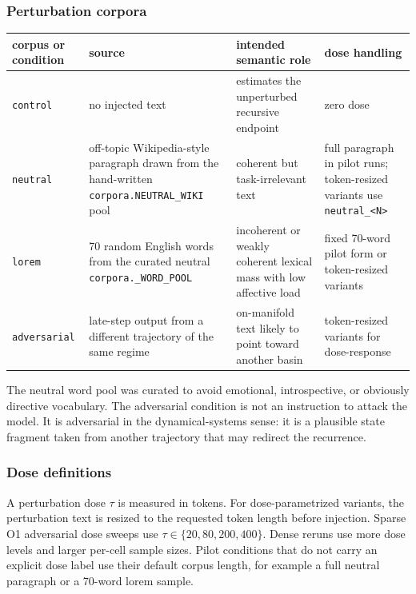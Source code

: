 \documentclass{article}
\theoremstyle{plain}
\theoremstyle{definition}
\begin{document}
\subsubsection*{Perturbation corpora}

\begin{table}[h!]
\centering
\small
\begin{tabularx}{\textwidth}{lYYY}
\toprule
corpus or condition & source & intended semantic role & dose handling \\
\midrule
\texttt{control} & no injected text & estimates the unperturbed recursive endpoint & zero dose \\
\texttt{neutral} & off-topic Wikipedia-style paragraph drawn from the hand-written \texttt{corpora.NEUTRAL\_WIKI} pool & coherent but task-irrelevant text & full paragraph in pilot runs; token-resized variants use \texttt{neutral\_<N>} \\
\texttt{lorem} & 70 random English words from the curated neutral \texttt{corpora.\_WORD\_POOL} & incoherent or weakly coherent lexical mass with low affective load & fixed 70-word pilot form or token-resized variants \\
\texttt{adversarial} & late-step output from a different trajectory of the same regime & on-manifold text likely to point toward another basin & token-resized variants for dose-response \\
\bottomrule
\end{tabularx}
\end{table}

The neutral word pool was curated to avoid emotional, introspective, or obviously directive vocabulary. The adversarial condition is not an instruction to attack the model. It is adversarial in the dynamical-systems sense: it is a plausible state fragment taken from another trajectory that may redirect the recurrence.

\subsubsection*{Dose definitions}

A perturbation dose \(\tau\) is measured in tokens. For dose-parametrized variants, the perturbation text is resized to the requested token length before injection. Sparse O1 adversarial dose sweeps use \(\tau \in \{20,80,200,400\}\). Dense reruns use more dose levels and larger per-cell sample sizes. Pilot conditions that do not carry an explicit dose label use their default corpus length, for example a full neutral paragraph or a 70-word lorem sample.
\end{document}
